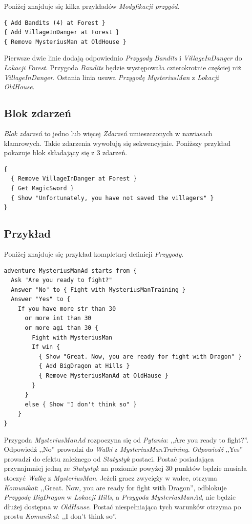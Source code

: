 \documentclass[openright]{xmgr}
\begin{document}
Poniżej znajduje się kilka przykładów \textit{Modyfikacji przygód}. 
\begin{verbatim}
{ Add Bandits (4) at Forest }
{ Add VillageInDanger at Forest }
{ Remove MysteriusMan at OldHouse }
\end{verbatim}
Pierwsze dwie linie dodają odpowiednio \textit{Przygody} \textit{Bandits} i \textit{VillageInDanger} do \textit{Lokacji} \textit{Forest}. Przygoda \textit{Bandits} będzie występowała czterokrotnie częściej niż \textit{VillageInDanger}. Ostania linia usuwa \textit{Przygodę} \textit{MysteriusMan} z \textit{Lokacji} \textit{OldHouse}.

\subsection*{Blok zdarzeń}
\textit{Blok zdarzeń} to jedno lub więcej \textit{Zdarzeń} umieszczonych w nawiasach klamrowych. Takie zdarzenia wywołują się sekwencyjnie.
Poniższy przykład pokazuje blok składający się z 3 zdarzeń.
\begin{verbatim}
{
  { Remove VillageInDanger at Forest }
  { Get MagicSword }
  { Show "Unfortunately, you have not saved the villagers" }
}
\end{verbatim}

\subsection*{Przykład}
Poniżej znajduje się przykład kompletnej definicji \textit{Przygody}.
\begin{verbatim}
adventure MysteriusManAd starts from {
  Ask "Are you ready to fight?"
  Answer "No" to { Fight with MysteriusManTraining }
  Answer "Yes" to {
    If you have more str than 30 
      or more int than 30 
      or more agi than 30 {
        Fight with MysteriusMan
        If win {
          { Show "Great. Now, you are ready for fight with Dragon" }
          { Add BigDragon at Hills }
          { Remove MysteriusManAd at OldHause }
        }
      }
      else { Show "I don't think so" }
    }
}
\end{verbatim}
Przygoda \textit{MysteriusManAd} rozpoczyna się od \textit{Pytania}: ,,Are you ready to fight?''. Odpowiedź ,,No'' prowadzi do \textit{Walki} z \textit{MysteriusManTraining}.
\textit{Odpowiedź} ,,Yes'' prowadzi do efektu zależnego od \textit{Statystyk} postaci. Postać posiadająca przynajmniej jedną ze \textit{Statystyk} na poziomie powyżej 30 punktów będzie musiała stoczyć \textit{Walkę} z \textit{MysteriusMan}. Jeżeli gracz zwycięży w walce, otrzyma \textit{Komunikat}: ,,Great. Now, you are ready for fight with Dragon'', odblokuje \textit{Przygodę} \textit{BigDragon} w \textit{Lokacji} \textit{Hills}, a \textit{Przygoda} \textit{MysteriusManAd}, nie będzie dłużej dostępna w \textit{OldHause}. Postać niespełniająca tych warunków otrzyma po prostu \textit{Komunikat}: ,,I don't think so''. 
\end{document}
